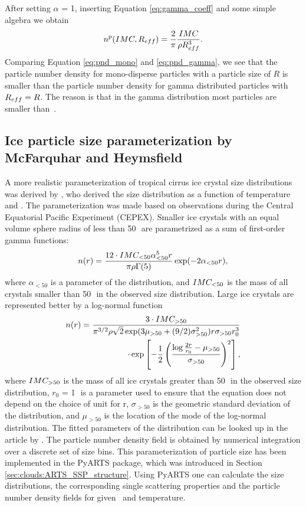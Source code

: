 After setting $\alpha$ = 1, inserting Equation \ref{eq:gamma_coeff} and
some simple algebra we obtain
\begin{equation}
  \label{eq:pnd_gamma}
  n^p(IMC, R_{eff}) = \frac{2}{\pi} \frac{IMC}{\rho R_{eff}^3}.
\end{equation}
Comparing Equation \ref{eq:pnd_mono} and \ref{eq:pnd_gamma}, we see
that the particle number density for mono-disperse particles with a
particle size of $R$ is smaller than the particle number density for
gamma distributed particles with $R_{eff}=R$. The reason is that in the
gamma distribution most particles are smaller than~\Reff.

\subsection[McFarquhar and Heymsfield parametrization]{Ice particle size parameterization by McFarquhar and Heymsfield}
\label{sec:McFHey_distr}

A more realistic parameterization of tropical cirrus ice crystal size
distributions was derived by
\citet{mcfarquar97:_param_tropic_cirrus_ice_cryst}, who derived the
size distribution as a function of temperature and \imc. The
parameterization was made based on observations during the Central
Equatorial Pacific Experiment (CEPEX). Smaller ice crystals with an
equal volume sphere radius of less than 50\,\mum\ are parametrized
as a sum of first-order gamma functions:
\begin{equation}
  \label{eq:MH_gamma}
  n(r) = \frac{12\cdot IMC_{<50}\alpha^5_{<50} r}{\pi \rho
    \Gamma(5)} \exp(-2 \alpha_{<50} r), 
\end{equation}
where $\alpha_{<50}$ is a parameter of the distribution, and
$IMC_{<50}$ is the mass of all crystals smaller than 50\,\mum\ in
the observed size distribution.  Large ice crystals are represented
better by a log-normal function
\begin{eqnarray}
  \label{eq:MH_lognorm}
  n(r) = \frac{3\cdot IMC_{>50}}{\pi^{3/2}\rho \sqrt{2}
    \exp(3\mu_{>50}+(9/2)\sigma^2_{>50}) r \sigma_{>50} r_0^3}
  \nonumber \\
  \cdot \exp\left[-\frac{1}{2}\left(\frac{\log\frac{2r}{r_0} -
          \mu_{>50}}{\sigma_{>50}}\right)^2\right], 
\end{eqnarray}
where $IMC_{>50}$ is the mass of all ice crystals greater than
50\,\mum\ in the observed size distribution, $r_0$ = 1\,\mum\ is a
parameter used to ensure that the equation does not depend on the
choice of unit for r, $\sigma_{>50}$ is the geometric standard
deviation of the distribution, and $\mu_{>50}$ is the location of the
mode of the log-normal distribution.  The fitted parameters of the
distribution can be looked up in the article by
\citet{mcfarquar97:_param_tropic_cirrus_ice_cryst}.  The particle
number density field is obtained by numerical integration over a
discrete set of size bins. This parameterization of particle size has
been implemented in the PyARTS package, which was introduced in
Section \ref{sec:clouds:ARTS_SSP_structure}. Using PyARTS one can calculate the size
distributions, the corresponding single scattering properties and the
particle number density fields for given \imc\ and temperature.
